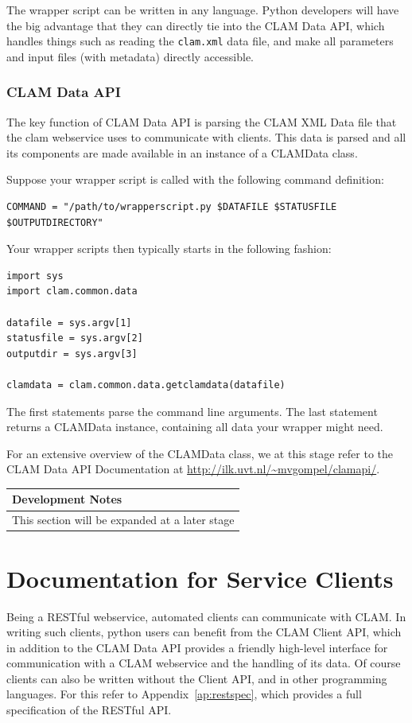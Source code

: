 \documentclass[a4paper,12pt]{report}
\newenvironment{devnotes}
{\newpage
\begin{center}
    \begin{tabular}[h!]{|p{0.8\textwidth}|}
    \hline
    {\bf Development Notes}\\\hline}
{   \\\hline
    \end{tabular}
\end{center}}
\begin{document}
The wrapper script can be written in any language. Python developers will have the big advantage that they can directly tie into the CLAM Data API, which handles things such as reading the \texttt{clam.xml} data file, and make all parameters and input files (with metadata) directly accessible.

\subsection{CLAM Data API}

The key function of CLAM Data API is parsing the CLAM XML Data file that the clam webservice uses to communicate with clients. This data is parsed and all its components are made available in an instance of a CLAMData class.

Suppose your wrapper script is called with the following command definition:

\begin{verbatim}
COMMAND = "/path/to/wrapperscript.py $DATAFILE $STATUSFILE $OUTPUTDIRECTORY"
\end{verbatim}

Your wrapper scripts then typically starts in the following fashion:


\begin{verbatim}
import sys
import clam.common.data

datafile = sys.argv[1]
statusfile = sys.argv[2]
outputdir = sys.argv[3]

clamdata = clam.common.data.getclamdata(datafile)
\end{verbatim}

The first statements parse the command line arguments. The last statement returns a CLAMData instance, containing all data your wrapper might need.

For an extensive overview of the CLAMData class, we at this stage refer to the CLAM Data API Documentation at \url{http://ilk.uvt.nl/~mvgompel/clamapi/}.

\begin{devnotes}
This section will be expanded at a later stage
\end{devnotes}


\chapter{Documentation for Service Clients}

Being a RESTful webservice, automated clients can communicate with CLAM. In writing such clients, python users can benefit from the CLAM Client API, which in addition to the CLAM Data API provides a friendly high-level interface for communication with a CLAM webservice and the handling of its data. Of course clients can also be written without the Client API, and in other programming languages. For this refer to Appendix~\ref{ap:restspec}, which provides a full specification of the RESTful API.
\end{document}
